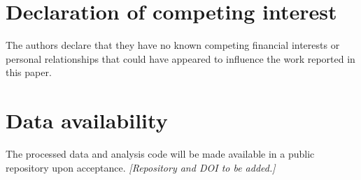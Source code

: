\documentclass[12pt,a4paper]{article}
\begin{document}
\section*{Declaration of competing interest}

The authors declare that they have no known competing financial interests or
personal relationships that could have appeared to influence the work
reported in this paper.

\section*{Data availability}

The processed data and analysis code will be made available in a public
repository upon acceptance. \textit{[Repository and DOI to be added.]}



\end{document}
